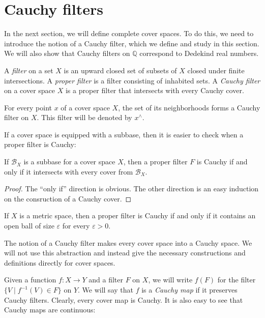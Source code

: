 \documentclass[reqno]{amsart}
\theoremstyle{definition}
\theoremstyle{remark}
\numberwithin{figure}{section}
\begin{document}
\section{Cauchy filters}

In the next section, we will define complete cover spaces.
To do this, we need to introduce the notion of a Cauchy filter, which we define and study in this section.
We will also show that Cauchy filters on $\mathbb{Q}$ correspond to Dedekind real numbers.

\begin{defn}
A \emph{filter} on a set $X$ is an upward closed set of subsets of $X$ closed under finite intersections.
A \emph{proper filter} is a filter consisting of inhabited sets.
A \emph{Cauchy filter} on a cover space $X$ is a proper filter that intersects with every Cauchy cover.
\end{defn}

\begin{example}
For every point $x$ of a cover space $X$, the set of its neighborhoods forms a Cauchy filter on $X$.
This filter will be denoted by $x^\wedge$.
\end{example}

If a cover space is equipped with a subbase, then it is easier to check when a proper filter is Cauchy:

\begin{prop}
If $\mathcal{B}_X$ is a subbase for a cover space $X$, then a proper filter $F$ is Cauchy if and only if it intersects with every cover from $\mathcal{B}_X$.
\end{prop}
\begin{proof}
The ``only if'' direction is obvious.
The other direction is an easy induction on the consruction of a Cauchy cover.
\end{proof}

\begin{cor}
If $X$ is a metric space, then a proper filter is Cauchy if and only if it contains an open ball of size $\varepsilon$ for every $\varepsilon > 0$.
\end{cor}

The notion of a Cauchy filter makes every cover space into a Cauchy space. %
We will not use this abstraction and instead give the necessary constructions and definitions directly for cover spaces.

Given a function $f : X \to Y$ and a filter $F$ on $X$, we will write $f(F)$ for the filter $\{ V \mid f^{-1}(V) \in F \}$ on $Y$.
We will say that $f$ is a \emph{Cauchy map} if it preserves Cauchy filters.
Clearly, every cover map is Cauchy.
It is also easy to see that Cauchy maps are continuous:
\end{document}
